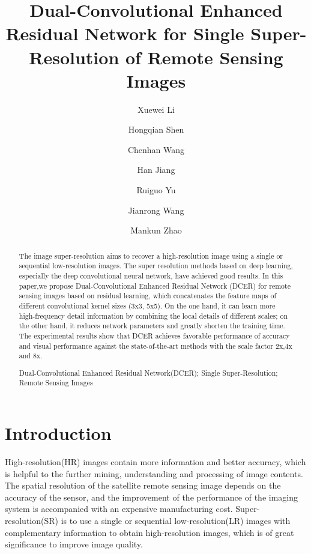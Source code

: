 \documentclass[runningheads,a4paper]{llncs}
\newcommand{\keywords}[1]{\par\addvspace\baselineskip
\noindent\keywordname\enspace\ignorespaces#1}
\begin{document}
\mainmatter  %

\title{Dual-Convolutional Enhanced Residual Network for Single Super-Resolution of Remote Sensing Images}

\author{Xuewei Li \and
Hongqian Shen \and
Chenhan Wang\and Han Jiang \and Ruiguo Yu\Envelope \and Jianrong Wang \and Mankun Zhao}
%


\maketitle


\begin{abstract}
The image super-resolution aims to recover a high-resolution image using a single or sequential low-resolution images. The super resolution methods based on deep learning, especially the deep convolutional neural network, have achieved good results. In this paper,we propose Dual-Convolutional Enhanced Residual Network (DCER) for remote sensing images based on residual learning, which concatenates the feature maps of different convolutional kernel sizes (3x3, 5x5). On the one hand, it can learn more high-frequency detail information by combining the local details of different scales; on the other hand, it reduces network parameters and greatly shorten the training time. The experimental results show that DCER achieves favorable performance of accuracy and visual performance against the state-of-the-art methods with the scale factor 2x,4x and 8x.
\keywords{Dual-Convolutional Enhanced Residual Network(DCER); Single Super-Resolution; Remote Sensing Images}
\end{abstract}


\section{Introduction}
High-resolution(HR) images contain more information and better accuracy, which is helpful to the further mining, understanding and processing of image contents. The spatial resolution of the satellite remote sensing image depends on the accuracy of the sensor, and the improvement of the performance of the imaging system is accompanied with an expensive manufacturing cost. Super-resolution(SR) \cite{Kolte2013Image} is to use a single or sequential low-resolution(LR) images with complementary information to obtain high-resolution images, which is of great significance to improve image quality.
\end{document}

